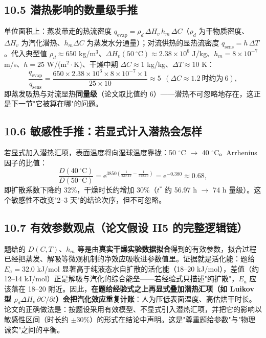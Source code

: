 \documentclass[12pt,a4paper]{ctexart}
\begin{document}
\subsection{10.5 潜热影响的数量级手推}

单位面积上：蒸发带走的热流密度 $q_{\mathrm{evap}}=\rho_d\,\Delta H_v\,h_m\,\Delta C$（$\rho_d$ 为干物质密度、$\Delta H_v$ 为汽化潜热、$h_m\Delta C$ 为蒸发水分通量）；对流供热的显热流密度 $q_{\mathrm{sens}}=h\,\Delta T$。代入典型值 $\rho_d\approx650$ kg/m$^3$、$\Delta H_v(50\ ^\circ\mathrm{C})\approx2.38\times10^6$ J/kg、$h_m=8\times10^{-7}$ m/s、$h=25$ W/(m$^2\!\cdot$K)、干燥中期 $\Delta C\approx1$ kg/kg、$\Delta T\approx10$ K：
\begin{equation}
\frac{q_{\mathrm{evap}}}{q_{\mathrm{sens}}}
=\frac{650\times2.38\times10^6\times8\times10^{-7}\times1}{25\times10}
\approx5\ \ (\Delta C\approx1.2\ \text{时约为}\ 6),
\end{equation}
即蒸发吸热与对流显热\textbf{同量级}（论文取比值约 6）——潜热不可忽略地存在，这正是下一节"它被算在哪"的问题。

\subsection{10.6 敏感性手推：若显式计入潜热会怎样}

若显式加入潜热汇项，表面温度将向湿球温度靠拢：50 $^\circ$C $\to$ 40 $^\circ$C。Arrhenius 因子的比值：
\begin{equation}
\frac{D(40\,^\circ\mathrm{C})}{D(50\,^\circ\mathrm{C})}
=\mathrm{e}^{3850\left(\frac{1}{323.15}-\frac{1}{313.15}\right)}
=\mathrm{e}^{-0.380}\approx0.68,
\end{equation}
即扩散系数下降约 32\%，干燥时长约增加 30\%（$t^*$ 约 56.97 h $\to$ 74 h 量级）。这个敏感性不改变"2--3 天"的结论次序，但不可忽略。

\subsection{10.7 有效参数观点（论文假设 H5 的完整逻辑链）}

题给的 $D(C,T)$、$h_m$ 等是由\textbf{真实干燥实验数据拟合}得到的有效参数，拟合过程已经把蒸发、解吸等微观机制的净效应吸收进参数值里。证据就是活化能：题给 $E_a=32.0$ kJ/mol 显著高于纯液态水自扩散的活化能（18--20 kJ/mol），差值（约 12--14 kJ/mol）正是解吸与汽化的综合能垒——若经验式只描述"纯扩散"，$E_a$ 应该落在 18--20 附近。因此，\textbf{在题给经验式之上再显式叠加潜热汇项（如 Luikov 型 $\rho_d\Delta H_v\,\partial C/\partial t$）会把汽化效应重复计账}：人为压低表面温度、高估烘干时长。论文的正确做法是：按题设采用有效模型、不显式引入潜热汇项，并把它的影响以敏感性区间（时长约 $\pm30\%$）的形式在结论中声明。这是"尊重题给参数"与"物理诚实"之间的平衡。
\end{document}
